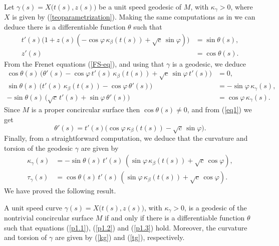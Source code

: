 \documentclass[eqnumis, pdf]{hjms}
\begin{document}
Let $\gamma(s)=X\big(t(s),z(s)\big)$ be a unit speed geodesic of $M$, with $\kappa_\gamma>0$, where $X$ is given by (\ref{teoparametrization}). Making the same computations as in \cite{LO16a} we can deduce there is a differentiable function $\theta$ such that
\begin{align}
t'(s)\big(1+z(s)(-\cos\varphi\,\kappa_\beta(t(s))+\sqrt{c}\,\sin\varphi)\big) &= \sin\theta(s),\label{p1.1}\\
z'(s) &= \cos\theta(s).\label{p1.2}
\end{align}
From the Frenet equations (\ref{FS-eq}), and using that $\gamma$ is a geodesic, we deduce
\begin{align}
\cos\theta(s)\,\big(\theta'(s)-\cos\varphi\, t'(s)\,\kappa_\beta(t(s))+\sqrt{c}\,\sin\varphi\,t'(s)\big) &= 0,\label{eq1}\\
\sin\theta(s)\,\big(t'(s)\,\kappa_\beta(t(s))-\cos\varphi\, \theta'(s)\big) &= -\sin\varphi\,\kappa_\gamma(s),\label{eq2}\\
-\sin\theta(s)\,\big(\sqrt{c}\,t'(s)+\sin\varphi\,\theta'(s)\big) &= \cos\varphi\,\kappa_\gamma(s).\label{eq3}
\end{align}
Since $M$ is a proper concircular surface then $\cos\theta(s)\neq0$, and from (\ref{eq1}) we get
\begin{equation}\label{p1.3}
\theta'(s)= t'(s)\big(\cos\varphi\,\kappa_\beta(t(s))-\sqrt{c}\,\sin\varphi\big).
\end{equation}
Finally, from a straightforward computation, we deduce that the curvature and torsion of the geodesic $\gamma$ are given by
\begin{align}
\kappa_\gamma(s) &= -\sin\theta(s)\,t'(s)\,(\sin\varphi\,\kappa_\beta(t(s))+\sqrt{c}\,\cos\varphi),\label{kg}\\
\tau_\gamma(s) &= \cos\theta(s)\,t'(s)\,(\sin\varphi\,\kappa_\beta(t(s))+\sqrt{c}\,\cos\varphi).\label{tg}
\end{align}
We have proved the following result.
\begin{proposition}\label{intp1}
A unit speed curve $\gamma(s)=X\big(t(s),z(s)\big)$, with $\kappa_\gamma>0$, is a geodesic of the nontrivial concircular surface $M$ if and only if there is a differentiable function $\theta$ such that equations (\ref{p1.1}), (\ref{p1.2}) and (\ref{p1.3}) hold. Moreover, the curvature and torsion of $\gamma$ are given by (\ref{kg}) and (\ref{tg}), respectively.
\end{proposition}
\end{document}
